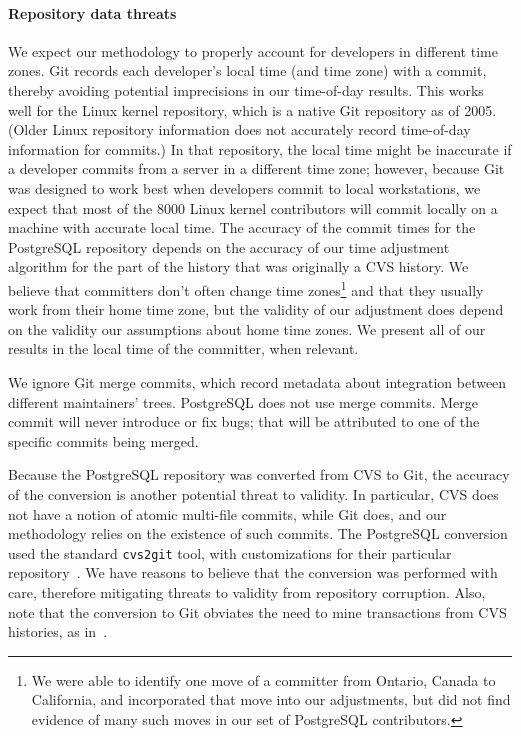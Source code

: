 \paragraph{Repository data threats}

We expect our methodology to properly account for developers in different time
zones. Git records each developer's local time (and time zone) with a commit,
thereby avoiding potential imprecisions in our time-of-day results. This works
well for the Linux kernel repository, which is a native Git repository as of
2005. (Older Linux repository information does not accurately record time-of-day
information for commits.) In that repository, the local time might be inaccurate
if a developer commits from a server in a different time zone; however, because
Git was designed to work best when developers commit to local workstations, we
expect that most of the 8000 Linux kernel contributors will commit locally on a
machine with accurate local time. The accuracy of the commit times for the
PostgreSQL repository depends on the accuracy of our time adjustment algorithm
for the part of the history that was originally a CVS history. We believe that
committers don't often change time zones\footnote{We were able to identify one
 move of a committer from Ontario, Canada to California, and incorporated that move
 into our adjustments, but did not find evidence of many such moves in our set
 of PostgreSQL contributors.} and that they usually work from their home time
zone, but the validity of our adjustment does depend on the validity our
assumptions about home time zones. We present all of our results in the local
time of the committer, when relevant.

We ignore Git merge commits, which record metadata about integration between
different maintainers' trees. PostgreSQL does not use merge commits. Merge
commit will never introduce or fix bugs; that will be attributed to one of the
specific commits being merged.

Because the PostgreSQL repository was converted from CVS to Git, the accuracy of
the conversion is another potential threat to validity. In particular, CVS does
not have a notion of atomic multi-file commits, while Git does, and our
methodology relies on the existence of such commits. The PostgreSQL conversion
used the standard {\tt cvs2git} tool, with customizations for their particular
repository~\cite{haas09:_so_why_postg_using_git}. We have reasons to believe
that the conversion was performed with care, therefore mitigating threats to
validity from repository corruption. Also, note that the conversion to Git
obviates the need to mine transactions from CVS histories, as
in~\cite{zimmermann-msr-2004}.

